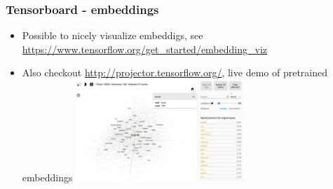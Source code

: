 \documentclass{beamer}
\begin{document}
\begin{frame}[fragile]
 \frametitle{Tensorboard - embeddings}
   \begin{itemize}
		\item Possible to nicely visualize embeddigs, see \url{https://www.tensorflow.org/get_started/embedding_viz}
		\item Also checkout \url{http://projector.tensorflow.org/}, live demo of pretrained embeddings
		\includegraphics[width=0.5\textwidth]{04_embed_viz.png}
	\end{itemize}
\end{frame}
\end{document}
